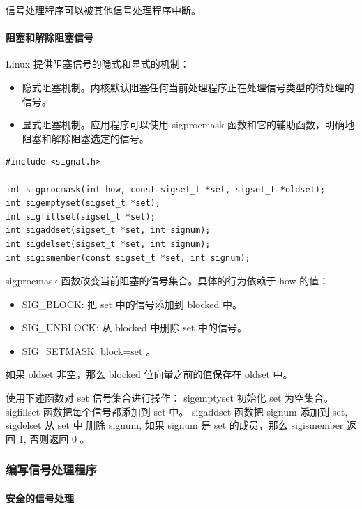 信号处理程序可以被其他信号处理程序中断。

\paragraph{阻塞和解除阻塞信号}

Linux 提供阻塞信号的隐式和显式的机制：
\begin{itemize}
    \item 隐式阻塞机制。内核默认阻塞任何当前处理程序正在处理信号类型的待处理的信号。
    \item 显式阻塞机制。应用程序可以使用 sigprocmask 函数和它的辅助函数，明确地阻塞和解除阻塞选定的信号。
\end{itemize}

\begin{lstlisting}[style=CStyle]
#include <signal.h>

int sigprocmask(int how, const sigset_t *set, sigset_t *oldset);
int sigemptyset(sigset_t *set);
int sigfillset(sigset_t *set);
int sigaddset(sigset_t *set, int signum);
int sigdelset(sigset_t *set, int signum);
int sigismember(const sigset_t *set, int signum);
\end{lstlisting}

sigprocmask 函数改变当前阻塞的信号集合。具体的行为依赖于 how 的值：
\begin{itemize}
    \item SIG\_BLOCK: 把 set 中的信号添加到 blocked 中。
    \item SIG\_UNBLOCK: 从 blocked 中删除 set 中的信号。
    \item SIG\_SETMASK: block=set 。
\end{itemize}

如果 oldset 非空，那么 blocked 位向量之前的值保存在 oldset 中。

使用下述函数对 set 信号集合进行操作： sigemptyset 初始化 set 为空集合。 sigfillset
函数把每个信号都添加到 set 中。 sigaddset 函数把 signum 添加到 set, sigdelset 从 set 中
删除 signum, 如果 signum 是 set 的成员，那么 sigismember 返回 1, 否则返回 0 。

\subsubsection{编写信号处理程序}

\paragraph{安全的信号处理}


